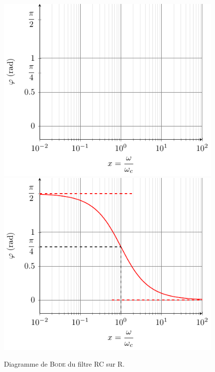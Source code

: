 \documentclass[../../main/main.tex]{subfiles}
\begin{document}
\begin{figure}[htbp!]
{{			\includegraphics[width=.95\linewidth]{RCR_bode-phase_plain}
		}{
			\includegraphics[width=.95\linewidth]{RCR_bode-phase}
		}
		\vspace{-15pt}
	}
	\caption{Diagramme de \textsc{Bode} du filtre RC sur R.}
	\label{fig:rcrbode}
\end{figure}
\end{document}
